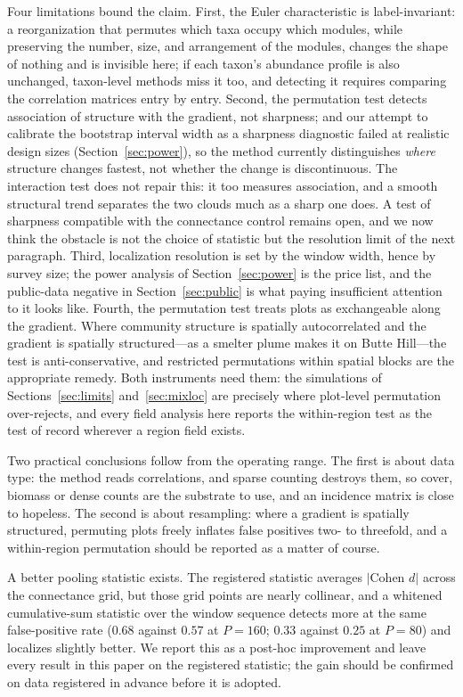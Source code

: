 \documentclass[review,12pt,authoryear]{elsarticle}
\theoremstyle{remark}
\begin{document}
Four limitations bound the claim. First, the Euler characteristic is
label-invariant: a reorganization that permutes which taxa occupy which
modules, while preserving the number, size, and arrangement of the modules,
changes the shape of nothing and is invisible here; if each taxon's abundance
profile is also unchanged, taxon-level methods miss it too, and detecting it
requires comparing the correlation matrices entry by entry. Second, the permutation test detects
association of structure with the gradient, not sharpness; and our attempt to
calibrate the bootstrap interval width as a sharpness diagnostic failed at
realistic design sizes (Section~\ref{sec:power}), so the method currently
distinguishes \emph{where} structure changes fastest, not whether the change
is discontinuous. The interaction test does not repair this: it too measures
association, and a smooth structural trend separates the two clouds much as
a sharp one does. A test of sharpness compatible with the connectance
control remains open, and we now think the obstacle is not the choice of
statistic but the resolution limit of the next paragraph. Third, localization resolution is set by the window
width, hence by survey size; the power analysis of Section~\ref{sec:power} is
the price list, and the public-data negative in
Section~\ref{sec:public} is what paying insufficient attention to it looks
like. Fourth, the permutation test treats plots as exchangeable along the
gradient. Where community structure is spatially autocorrelated and the
gradient is spatially structured---as a smelter plume makes it on Butte
Hill---the test is anti-conservative, and restricted permutations within
spatial blocks are the appropriate remedy. Both instruments need them: the
simulations of Sections~\ref{sec:limits} and~\ref{sec:mixloc} are precisely
where plot-level permutation over-rejects, and every field analysis here
reports the within-region test as the test of record wherever a region field
exists.

Two practical conclusions follow from the operating range. The first is
about data type: the method reads correlations, and sparse counting
destroys them, so cover, biomass or dense counts are the substrate to use,
and an incidence matrix is close to hopeless. The second is about
resampling: where a gradient is spatially structured, permuting plots
freely inflates false positives two- to threefold, and a within-region
permutation should be reported as a matter of course.

A better pooling statistic exists. The registered statistic averages
$|$Cohen $d|$ across the connectance grid, but those grid points are nearly
collinear, and a whitened cumulative-sum statistic over the window sequence
detects more at the same false-positive rate ($0.68$ against $0.57$ at
$P = 160$; $0.33$ against $0.25$ at $P = 80$) and localizes slightly
better. We report this as a post-hoc improvement and leave every result in
this paper on the registered statistic; the gain should be confirmed on
data registered in advance before it is adopted.
\end{document}
